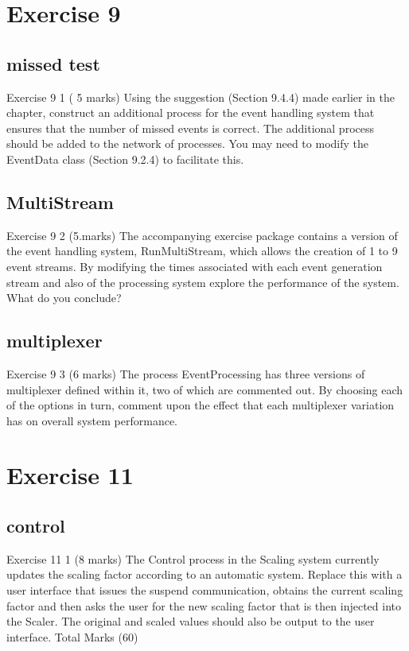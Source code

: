 \documentclass[10pt, a4paper]{article}
\begin{document}
   	\setcounter{section}{9}
   \section*{Exercise 9}
   
   \setcounter{subsection}{0}
   \subsection{missed test}
   
   Exercise 9 1   ( 5 marks)
   Using the suggestion (Section 9.4.4) made earlier in the chapter, construct an additional process for the event handling system that ensures that the number of missed events is correct.  The additional process should be added to the network of processes.  You may need to modify the EventData class (Section 9.2.4) to facilitate this.
   
   \subsection{MultiStream}
   Exercise 9 2   (5.marks)
   The accompanying exercise package contains a version of the event handling system, RunMultiStream, which allows the creation of 1 to 9 event streams.  By modifying the times associated with each event generation stream and also of the processing system explore the performance of the system.  What do you conclude?
   
   \subsection{multiplexer}
   Exercise 9 3   (6 marks)
   The process EventProcessing has three versions of multiplexer defined within it, two of which are commented out.  By choosing each of the options in turn, comment upon the effect that each multiplexer variation has on overall system performance.
   
   	\setcounter{section}{11}
   \section*{Exercise 11}
   
   \setcounter{subsection}{0}

   \subsection{control}
   Exercise 11 1   (8 marks)
   The Control process in the Scaling system currently updates the scaling factor according to an automatic system.  Replace this with a user interface that issues the suspend communication, obtains the current scaling factor and then asks the user for the new scaling factor that is then injected into the Scaler.  The original and scaled values should also be output to the user interface.
   Total Marks  (60)
   
	
\end{document}
